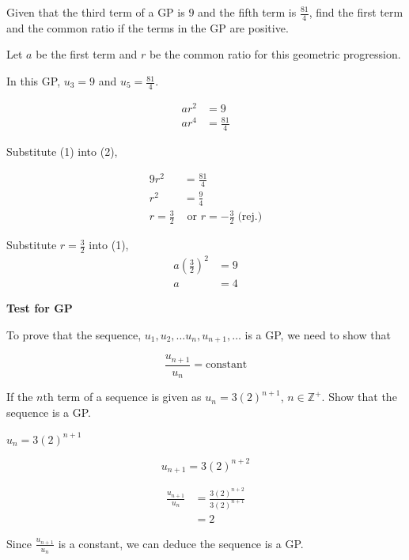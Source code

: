 \documentclass[11pt,a4paper]{book}
\newcommand{\Z}{\mathbb{Z}}
\begin{document}
\begin{example}


Given that the third term of a GP is $9$ and the fifth term is ${\displaystyle \frac{81}{4}}$,
find the first term and the common ratio if the terms in the GP are
positive.

\Solution

Let $a$ be the first term and $r$ be the common ratio for this geometric
progression.

In this GP, $u_{3}=9$ and ${\displaystyle u_{5}=\frac{81}{4}}$.

\begin{align*}
ar^{2} & =9\tag{1}\\
ar^{4} & =\frac{81}{4}\tag{2}
\end{align*}

Substitute (1) into (2),

\begin{align*}
9r^{2} & =\frac{81}{4}\\
r^{2} & =\frac{9}{4}\\
r=\frac{3}{2} & \text{ or }r=-\frac{3}{2}\;\text{(rej.)}
\end{align*}

Substitute ${\displaystyle r=\frac{3}{2}}$ into (1), 
\begin{align*}
a\left(\frac{3}{2}\right)^{2} & =9\\
a & =4
\end{align*}

\end{example}


\begin{tcolorbox}[colback=blue!5, colframe=black,boxrule=.4pt, sharpish corners]

\textbf{Test for GP}

\medskip{}

To prove that the sequence, $u_{1},u_{2},\ldots u_{n},u_{n+1},\ldots$
is a GP, we need to show that

\[
\frac{u_{n+1}}{u_{n}}=\text{constant}
\]
\end{tcolorbox}

\begin{example}

If the $n\text{th}$ term of a sequence is given as $u_{n}=3\left(2\right)^{n+1}$,
$n\in\Z^{+}$. Show that the sequence is a GP.

\Solution

$u_{n}=3\left(2\right)^{n+1}$

\[
u_{n+1}=3\left(2\right)^{n+2}
\]

\begin{align*}
\frac{u_{n+1}}{u_{n}} & =\frac{3\left(2\right)^{n+2}}{3\left(2\right)^{n+1}}\\
 & =2
\end{align*}

Since ${\displaystyle \frac{u_{n+1}}{u_{n}}}$ is a constant, we can
deduce the sequence is a GP.

\end{example}
\end{document}
